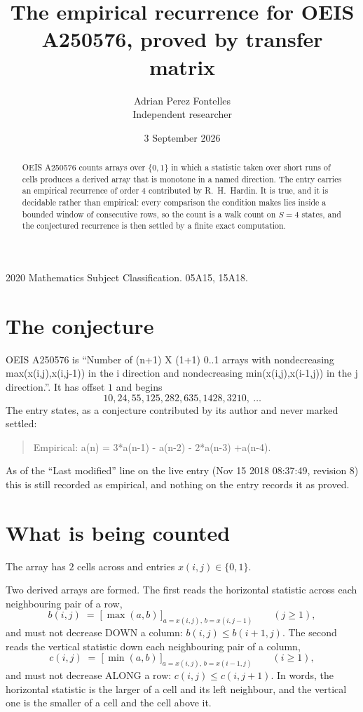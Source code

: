 \documentclass[11pt,a4paper]{article}
\title{The empirical recurrence for OEIS A250576, proved by transfer matrix}
\author{Adrian Perez Fontelles\\ \small Independent researcher}
\date{3 September 2026}
\theoremstyle{plain}
\theoremstyle{definition}
\begin{document}
\maketitle

\begin{abstract}
OEIS A250576 counts arrays over $\{0,1\}$ in which a statistic taken over short runs
of cells produces a derived array that is monotone in a named direction. The entry carries an
empirical recurrence of order $4$ contributed by R.~H.~Hardin. It is true, and it is
decidable rather than empirical: every comparison the condition makes lies inside a bounded
window of consecutive rows, so the count is a walk count on $S=4$ states, and the
conjectured recurrence is then settled by a finite exact computation.
\end{abstract}

\noindent\small 2020 Mathematics Subject Classification. 05A15, 15A18.\normalsize

\section{The conjecture}

OEIS A250576 is ``Number of (n+1) X (1+1) 0..1 arrays with nondecreasing max(x(i,j),x(i,j-1)) in the i direction and nondecreasing min(x(i,j),x(i-1,j)) in the j direction.''. It has offset $1$ and begins
\[
10, 24, 55, 125, 282, 635, 1428, 3210,\ \dots
\]
The entry states, as a conjecture contributed by its author and never marked settled:
\begin{quote}
Empirical: a(n) = 3*a(n-1) - a(n-2) - 2*a(n-3) +a(n-4).
\end{quote}
As of the ``Last modified'' line on the live entry (Nov 15 2018 08:37:49, revision 8) this is still
recorded as empirical, and nothing on the entry records it as proved.

\section{What is being counted}

The array has $2$ cells across and entries $x(i,j)\in\{0,1\}$.

Two derived arrays are formed. The first reads the horizontal statistic across each
neighbouring pair of a row,
\[
b(i,j)\;=\;\bigl[\,\max(a,b)\,\bigr]_{a=x(i,j),\,b=x(i,j-1)}\qquad (j\ge1),
\]
and must not decrease DOWN a column: $b(i,j)\le b(i{+}1,j)$. The second reads the vertical
statistic down each neighbouring pair of a column,
\[
c(i,j)\;=\;\bigl[\,\min(a,b)\,\bigr]_{a=x(i,j),\,b=x(i{-}1,j)}\qquad (i\ge1),
\]
and must not decrease ALONG a row: $c(i,j)\le c(i,j{+}1)$. In words, the horizontal statistic
is the larger of a cell and its left neighbour, and the vertical one is
the smaller of a cell and the cell above it.
\end{document}
